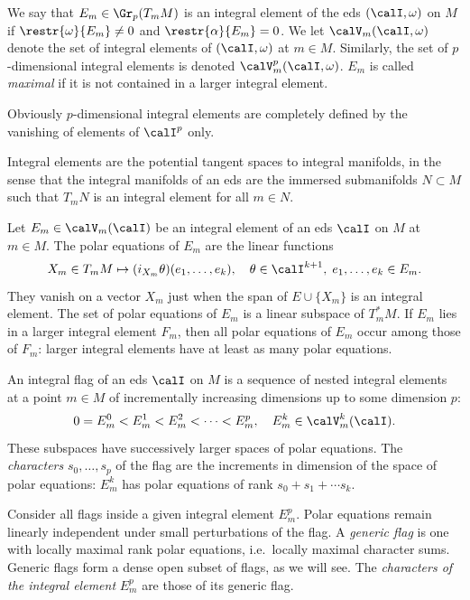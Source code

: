 \begin{defn}\label{def integral element}
    We say that $E_m\in \Gr_p(T_m M)$ is an integral element of the \gls{eds} $(\calI,\omega)$ on $M$ if $\restr{\omega}{E_m}\neq 0$ and $\restr{\alpha}{E_m}=0$. We let $\calV_m(\calI,\omega)$ denote the set of integral elements of $(\calI,\omega)$ at $m\in M$. Similarly, the set of $p$-dimensional integral elements is denoted $\calV^p_m(\calI,\omega)$. $E_m$ is called \emph{maximal} if it is not contained in a larger integral element.
\end{defn}

Obviously  $p$-dimensional integral elements are completely defined by the vanishing of elements of $\calI^p$ only.

Integral elements are the potential tangent spaces to integral manifolds, in the sense that the integral manifolds of an \gls{eds} are the immersed submanifolds $N\subset M$ such that $T_mN$ is an integral element for all $m\in N$.

\begin{defn}
    Let $E_m\in\calV_m(\calI)$ be an integral element of an \gls{eds} $\calI$ on $M$ at $m\in M$. The polar equations of $E_m$ are the linear functions 
    \[ X_m\in T_mM \mapsto (i_{X_m}\theta)(e_1,\ldots,e_k),\quad \theta\in\calI^{k+1},\; e_1,\ldots,e_k\in E_m.\]
    They vanish on a vector $X_m$ just when the span of $E\cup \{X_m\}$ is an integral element. The set of polar equations of $E_m$ is a linear subspace of $T_m^\ast M$. If $E_m$ lies in a larger integral element $F_m$, then all polar equations of $E_m$ occur among those of $F_m$: larger integral elements have at least as many polar equations.
\end{defn}

\begin{defn}
    An integral flag of an \gls{eds} $\calI$ on $M$ is a sequence of nested integral elements at a point $m\in M$ of incrementally increasing dimensions up to some dimension $p$:
    \[0=E^0_m< E^1_m< E^2_m< \cdots< E^p_m,\quad E^k_m\in\calV^k_m(\calI).\]
    These subspaces have successively larger spaces of polar equations. The \emph{characters} $s_0,\ldots,s_p$ of the flag are the increments in dimension of the space of polar equations: $E^k_m$ has polar equations of rank $s_0+s_1+\cdots s_k$.

    Consider all flags inside a given integral element $E^p_m$. Polar equations remain linearly independent under small perturbations of the flag. A \emph{generic flag} is one with locally maximal rank polar equations, i.e.\ locally maximal character sums. Generic flags form a dense open subset of flags, as we will see. The \emph{characters of the integral element} $E^p_m$ are those of its generic flag. 
\end{defn}

